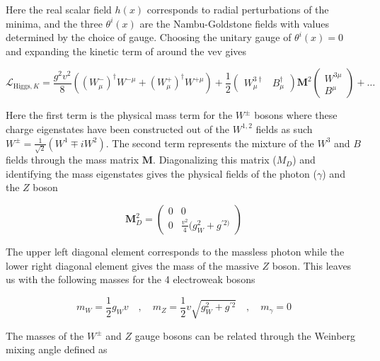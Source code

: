 Here the real scalar field $h(x)$ corresponds to radial perturbations of the
minima, and the three $\theta^{i}(x)$ are the Nambu-Goldstone fields with
values determined by the choice of gauge.  Choosing the unitary gauge of
$\theta^{i}(x) = 0$ and expanding the kinetic term of
 around the vev gives

\begin{equation} \label{eq:higgs:boson_masses}
\mathcal{L}_{\text{Higgs},K} = \frac{g^{2}v^{2}}{8} \left(
(W_{\mu}^{-})^{\dagger}W^{-\mu} + (W_{\mu}^{+})^{\dagger}W^{+\mu} \right) +
\frac{1}{2} \left( \begin{matrix} W_{\mu}^{3\dagger} & B_{\mu}^{\dagger}
\end{matrix} \right) \boldsymbol{M}^{2} \left( \begin{matrix} W^{3\mu} \\ B^{\mu}
\end{matrix} \right) + \ldots 
\end{equation}

Here the first term is the physical mass term for the $W^{\pm}$ bosons where
these charge eigenstates have been constructed out of the $W^{1,2}$ fields as
such $W^{\pm} = \frac{1}{\sqrt{2}}(W^{1} \mp iW^{2})$.  The second term
represents the mixture of the $W^{3}$ and $B$ fields through the mass matrix
$\boldsymbol{M}$.  Diagonalizing this matrix ($M_{D}$) and identifying the mass
eigenstates gives the physical fields of the photon ($\gamma$) and the $Z$
boson


\begin{equation}
\boldsymbol{M}_{D}^{2} = \left( \begin{matrix} 0 & 0 \\ 0 &
\frac{v^{2}}{4}(g_{W}^{2} + g^{'2)}   \end{matrix} \right)
\end{equation}

The upper left diagonal element corresponds to the massless photon
while the lower right diagonal element gives the mass of the massive $Z$ boson.
This leaves us with the following masses for the 4 electroweak bosons

\begin{equation}
m_{W} = \frac{1}{2}g_{W}v \quad , \quad m_Z = \frac{1}{2}v\sqrt{g_{W}^{2} + g^{'2}}
\quad , \quad m_\gamma = 0
\end{equation}

The masses of the $W^{\pm}$ and $Z$ gauge bosons can be related through the
Weinberg mixing angle defined as

